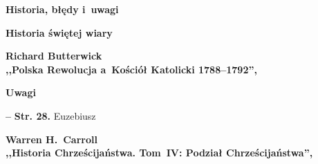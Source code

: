 \documentclass[a4paper,11pt]{article}
\newcommand{\spaceTwo}{2em}
\newcommand{\spaceThree}{1em}
\newcommand{\tb}{\textbf}
\newcommand{\noi}{\noindent}
\newcommand{\start}{\noi \tb{--} {}}
\newcommand{\Center}[1]{\begin{center} #1 \end{center}}
\newcommand{\CenterTB}[1]{\Center{\tb{#1}}}
\newcommand{\Str}[1]{\tb{Str. #1.}}
\newcommand{\Main}[1]{ \begin{center} {\huge \tb{#1} } \end{center} }
\newcommand{\Field}[1]{ \begin{center} {\LARGE \tb{#1} } \end{center} }
\newcommand{\Work}[1]{ \begin{center} {\large \tb{#1}} \end{center} }
\begin{document}



\Main{Historia, błędy i~uwagi}

\vspace{\spaceTwo} \vspace{\spaceThree}



\Field{Historia świętej wiary}

\vspace{\spaceTwo} %



\Work{
  Richard Butterwick \\
  ,,Polska Rewolucja a~Kościół Katolicki 1788--1792'',
  \cite{ButterwickPolskaRewolucjaAKosciolKatolicki12} }


\CenterTB{Uwagi}

\start \Str{28} Euzebiusz \\




\vspace{\spaceTwo}





\Work{
  Warren H.~Carroll \\
  ,,Historia Chrześcijaństwa. Tom~IV: Podział Chrześcijaństwa'',
  \cite{CarrollHistoriaChrzecijanstwaTomIV11} }
\end{document}
